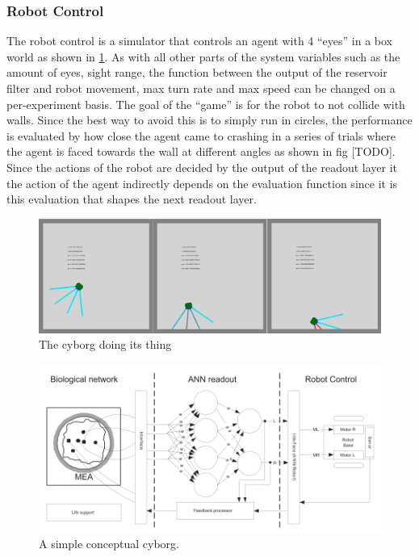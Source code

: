 \subsubsection{Robot Control}
The robot control is a simulator that controls an agent with 4 ``eyes'' in a box
world as shown in \ref{figGame}.
As with all other parts of the system variables such as the amount of eyes, sight
range, the function between the output of the reservoir filter and robot
movement, max turn rate and max speed can be changed on a per-experiment basis.
The goal of the ``game'' is for the robot to not collide with walls.
Since the best way to avoid this is to simply run in circles, the performance is
evaluated by how close the agent came to crashing in a series of trials where
the agent is faced towards the wall at different angles as shown in fig [TODO].
Since the actions of the robot are decided by the output of the readout layer it
the action of the agent indirectly depends on the evaluation function since it
is this evaluation that shapes the next readout layer.
\begin{figure}[h!]
  \centering
  \includegraphics[width=1\textwidth]{fig/TAC/game2.png}
  \caption{The cyborg doing its thing}
  \label{figGame}
\end{figure}
\begin{figure}[h!]
  \centering
  \includegraphics[width=1\textwidth]{fig/cyborg_overview.png}
  \caption{A simple conceptual cyborg.}
  \label{cyborgOverviewSimple}
\end{figure}
